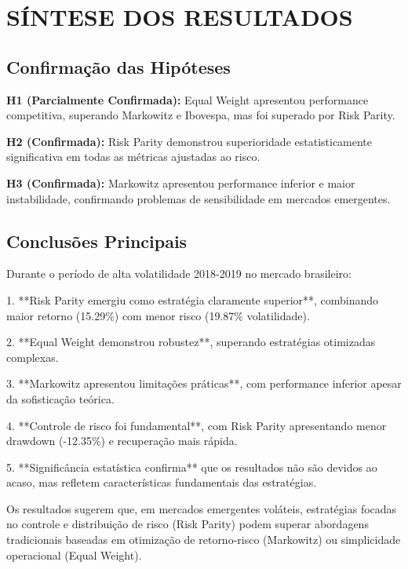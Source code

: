 \section{SÍNTESE DOS RESULTADOS}

\subsection{Confirmação das Hipóteses}

\textbf{H1 (Parcialmente Confirmada):} Equal Weight apresentou performance competitiva, superando Markowitz e Ibovespa, mas foi superado por Risk Parity.

\textbf{H2 (Confirmada):} Risk Parity demonstrou superioridade estatisticamente significativa em todas as métricas ajustadas ao risco.

\textbf{H3 (Confirmada):} Markowitz apresentou performance inferior e maior instabilidade, confirmando problemas de sensibilidade em mercados emergentes.

\subsection{Conclusões Principais}

Durante o período de alta volatilidade 2018-2019 no mercado brasileiro:

1. **Risk Parity emergiu como estratégia claramente superior**, combinando maior retorno (15.29\%) com menor risco (19.87\% volatilidade).

2. **Equal Weight demonstrou robustez**, superando estratégias otimizadas complexas.

3. **Markowitz apresentou limitações práticas**, com performance inferior apesar da sofisticação teórica.

4. **Controle de risco foi fundamental**, com Risk Parity apresentando menor drawdown (-12.35\%) e recuperação mais rápida.

5. **Significância estatística confirma** que os resultados não são devidos ao acaso, mas refletem características fundamentais das estratégias.

Os resultados sugerem que, em mercados emergentes voláteis, estratégias focadas no controle e distribuição de risco (Risk Parity) podem superar abordagens tradicionais baseadas em otimização de retorno-risco (Markowitz) ou simplicidade operacional (Equal Weight).